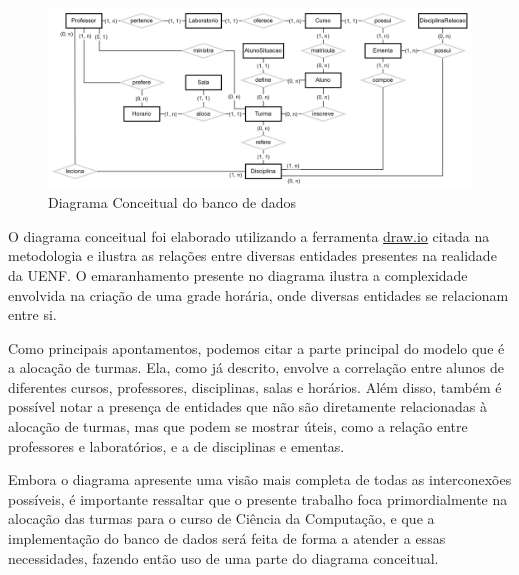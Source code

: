 \begin{figure}[htbp]\centering
  \caption{\label{fig:DiagramConceitual} Diagrama Conceitual do banco de dados}
  \includegraphics[scale=0.2]{files/img/DiagramaConceitual/DiagramaConceitualBranco.png}
\end{figure} %

O diagrama conceitual foi elaborado utilizando a ferramenta \href{https://www.drawio.com/}{draw.io} citada na metodologia e ilustra as relações entre diversas entidades presentes na realidade da UENF. O emaranhamento presente no diagrama ilustra a complexidade envolvida na criação de uma grade horária, onde diversas entidades se relacionam entre si.

Como principais apontamentos, podemos citar a parte principal do modelo que é a alocação de turmas. Ela, como já descrito, envolve a correlação entre alunos de diferentes cursos, professores, disciplinas, salas e horários. Além disso, também é possível notar a presença de entidades que não são diretamente relacionadas à alocação de turmas, mas que podem se mostrar úteis, como a relação entre professores e laboratórios, e a de disciplinas e ementas.

Embora o diagrama apresente uma visão mais completa de todas as interconexões possíveis, é importante ressaltar que o presente trabalho foca primordialmente na alocação das turmas para o curso de Ciência da Computação, e que a implementação do banco de dados será feita de forma a atender a essas necessidades, fazendo então uso de uma parte do diagrama conceitual.



